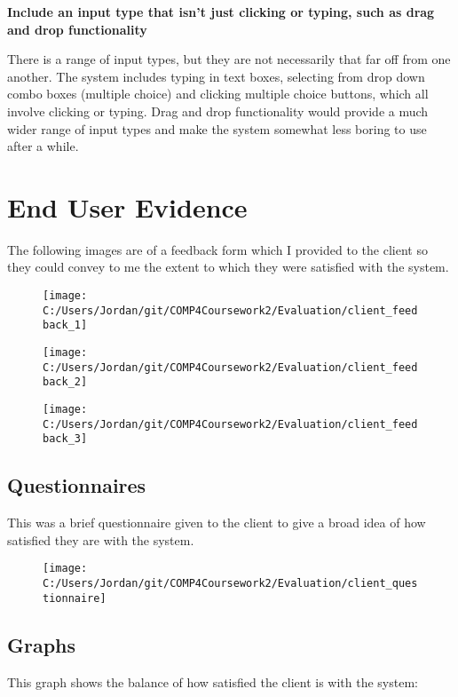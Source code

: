 \textbf{Include an input type that isn't just clicking or typing, such as drag and drop functionality}

There is a range of input types, but they are not necessarily that far off from one another. The system includes typing in text boxes, selecting from drop down combo boxes (multiple choice) and clicking multiple choice buttons, which all involve clicking or typing. Drag and drop functionality would provide a much wider range of input types and make the system somewhat less boring to use after a while.

\section{End User Evidence}

The following images are of a feedback form which I provided to the client so they could convey to me the extent to which they were satisfied with the system.

\begin{figure}[H]
	\texttt{[image: C:/Users/Jordan/git/COMP4Coursework2/Evaluation/client\_feedback\_1]}
\end{figure}

\begin{figure}[H]
	\texttt{[image: C:/Users/Jordan/git/COMP4Coursework2/Evaluation/client\_feedback\_2]}
\end{figure}

\begin{figure}[H]
	\texttt{[image: C:/Users/Jordan/git/COMP4Coursework2/Evaluation/client\_feedback\_3]}
\end{figure}

\subsection{Questionnaires}

This was a brief questionnaire given to the client to give a broad idea of how satisfied they are with the system.

\begin{figure}[H]
	\texttt{[image: C:/Users/Jordan/git/COMP4Coursework2/Evaluation/client\_questionnaire]}
\end{figure}

\subsection{Graphs}

This graph shows the balance of how satisfied the client is with the system:

